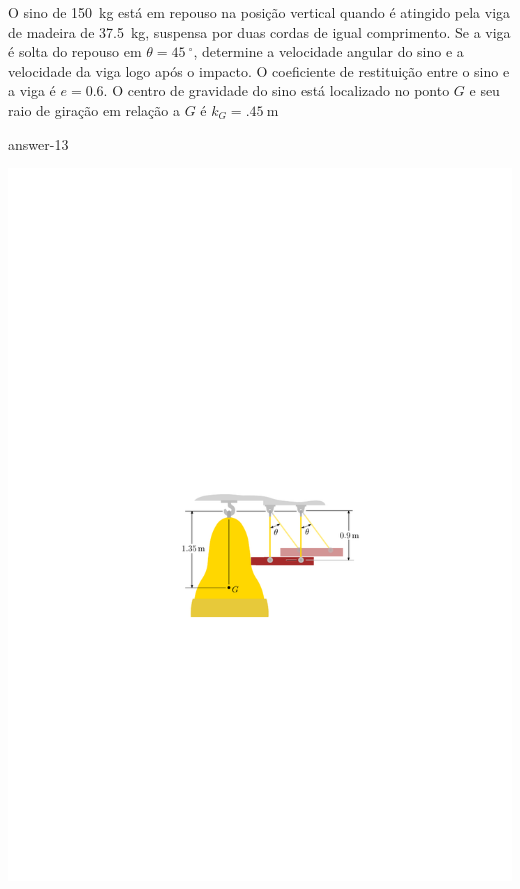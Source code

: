 \item O sino de \SI{150}{\kilogram} está em repouso na posição vertical quando é atingido pela viga de madeira de \SI{37.5}{\kilogram}, suspensa por duas cordas de igual comprimento. Se a viga é solta do repouso em $\theta=\SI{45}{^{\circ}}$, determine a velocidade angular do sino e a velocidade da viga logo após o impacto. O coeficiente de restituição entre o sino e a viga é $e=0.6$. O centro de gravidade do sino está localizado no ponto $G$ e seu raio de giração em relação a $G$ é $k_{G}=\SI{.45}{\meter}$

{answer-13}

\vspace{-1cm}
\begin{flushright}
	\includegraphics[scale=1.2]{../../images/draw_12}
\end{flushright}
